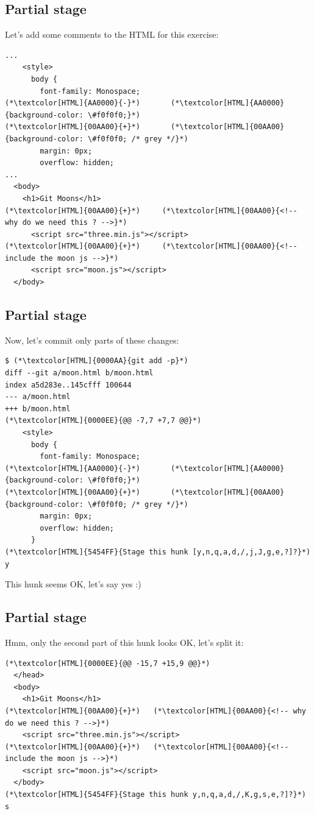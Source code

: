 \subsection{Partial stage}
\begin{frame}[fragile]
  \subslidetitle
  Let's add some comments to the HTML for this exercise:

  \begin{lstlisting}
...
    <style>
      body {
        font-family: Monospace;
(*\textcolor[HTML]{AA0000}{-}*)       (*\textcolor[HTML]{AA0000}{background-color: \#f0f0f0;}*)
(*\textcolor[HTML]{00AA00}{+}*)       (*\textcolor[HTML]{00AA00}{background-color: \#f0f0f0; /* grey */}*)
        margin: 0px;
        overflow: hidden;
...
  <body>
    <h1>Git Moons</h1>
(*\textcolor[HTML]{00AA00}{+}*)     (*\textcolor[HTML]{00AA00}{<!-- why do we need this ? -->}*)
      <script src="three.min.js"></script>
(*\textcolor[HTML]{00AA00}{+}*)     (*\textcolor[HTML]{00AA00}{<!-- include the moon js -->}*)
      <script src="moon.js"></script>
  </body>
\end{lstlisting}
\end{frame}

\subsection{Partial stage}
\begin{frame}[fragile]
  \subslidetitle
  Now, let's commit only parts of these changes:
  \begin{lstlisting}
$ (*\textcolor[HTML]{0000AA}{git add -p}*)
diff --git a/moon.html b/moon.html
index a5d283e..145cfff 100644
--- a/moon.html
+++ b/moon.html
(*\textcolor[HTML]{0000EE}{@@ -7,7 +7,7 @@}*)
    <style>
      body {
        font-family: Monospace;
(*\textcolor[HTML]{AA0000}{-}*)       (*\textcolor[HTML]{AA0000}{background-color: \#f0f0f0;}*)
(*\textcolor[HTML]{00AA00}{+}*)       (*\textcolor[HTML]{00AA00}{background-color: \#f0f0f0; /* grey */}*)
        margin: 0px;
        overflow: hidden;
      }
(*\textcolor[HTML]{5454FF}{Stage this hunk [y,n,q,a,d,/,j,J,g,e,?]?}*) y
\end{lstlisting}
  This hunk seems OK, let's say yes :)
\end{frame}

\subsection{Partial stage}
\begin{frame}[fragile]
  \subslidetitle
  Hmm, only the second part of this hunk looks OK, let's split it:
  \begin{lstlisting}
(*\textcolor[HTML]{0000EE}{@@ -15,7 +15,9 @@}*)
  </head>
  <body>
    <h1>Git Moons</h1>
(*\textcolor[HTML]{00AA00}{+}*)   (*\textcolor[HTML]{00AA00}{<!-- why do we need this ? -->}*)
    <script src="three.min.js"></script>
(*\textcolor[HTML]{00AA00}{+}*)   (*\textcolor[HTML]{00AA00}{<!-- include the moon js -->}*)
    <script src="moon.js"></script>
  </body>
(*\textcolor[HTML]{5454FF}{Stage this hunk y,n,q,a,d,/,K,g,s,e,?]?}*) s
\end{lstlisting}
\end{frame}

